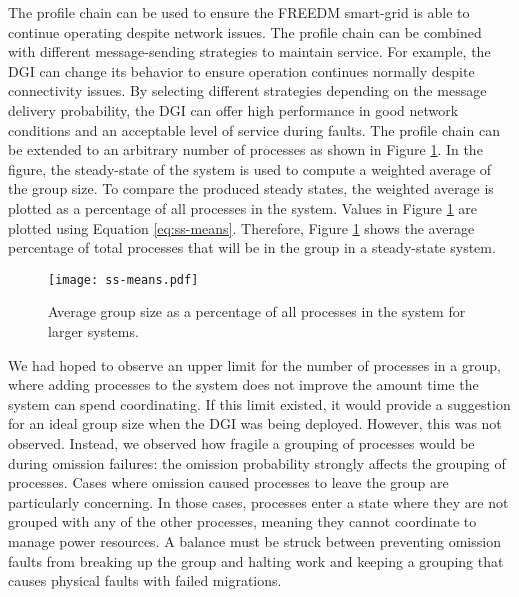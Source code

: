 The profile chain can be used to ensure the \ac{FREEDM} smart-grid is able to continue operating despite network issues.
The profile chain can be combined with different message-sending strategies to maintain service.
For example, the DGI can change its behavior to ensure operation continues normally despite connectivity issues.
By selecting different strategies depending on the message delivery probability, the DGI can offer high performance in good network conditions and an acceptable level of service during faults.
The profile chain can be extended to an arbitrary number of processes as shown in Figure \ref{fig:ss-means}.
In the figure, the steady-state of the system is used to compute a weighted average of the group size.
To compare the produced steady states, the weighted average is plotted as a percentage of all processes in the system.
Values in Figure \ref{fig:ss-means} are plotted using Equation \ref{eq:ss-means}.
Therefore, Figure \ref{fig:ss-means} shows the average percentage of total processes that will be in the group in a steady-state system.

\begin{figure}
    \centering
    \texttt{[image: ss-means.pdf]}
    \caption{Average group size as a percentage of all processes in the system for larger systems.}
    \label{fig:ss-means}
\end{figure}

We had hoped to observe an upper limit for the number of processes in a group, where adding processes to the system does not improve the amount time the system can spend coordinating.
If this limit existed, it would provide a suggestion for an ideal group size when the DGI was being deployed.
However, this was not observed.
Instead, we observed how fragile a grouping of processes would be during omission failures: the omission probability strongly affects the grouping of processes.
Cases where omission caused processes to leave the group are particularly concerning. 
In those cases, processes enter a state where they are not grouped with any of the other processes, meaning they cannot coordinate to manage power resources.
A balance must be struck between preventing omission faults from breaking up the group and halting work and keeping a grouping that causes physical faults with failed migrations.


